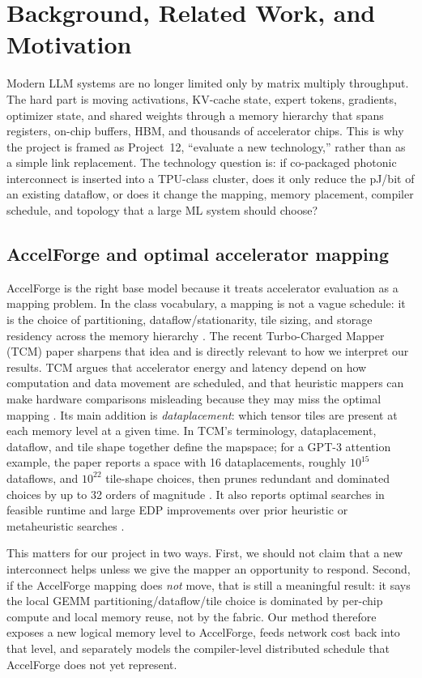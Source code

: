 \documentclass[conference]{IEEEtran}
\begin{document}
\section{Background, Related Work, and Motivation}
\label{sec:related}
Modern LLM systems are no longer limited only by matrix multiply
throughput. The hard part is moving activations, KV-cache state,
expert tokens, gradients, optimizer state, and shared weights through
a memory hierarchy that spans registers, on-chip buffers, HBM, and
thousands of accelerator chips. This is why the project is framed as
Project~12, ``evaluate a new technology,'' rather than as a simple
link replacement. The technology question is: if co-packaged
photonic interconnect is inserted into a TPU-class cluster, does it
only reduce the pJ/bit of an existing dataflow, or does it change the
mapping, memory placement, compiler schedule, and topology that a
large ML system should choose?

\subsection{AccelForge and optimal accelerator mapping}
AccelForge is the right base model because it treats accelerator
evaluation as a mapping problem. In the class vocabulary, a mapping
is not a vague schedule: it is the choice of partitioning,
dataflow/stationarity, tile sizing, and storage residency across the
memory hierarchy \cite{lec05-mapping,lec06-partitioning}. The recent
Turbo-Charged Mapper (TCM) paper sharpens that idea and is directly
relevant to how we interpret our results. TCM argues that accelerator
energy and latency depend on how computation and data movement are
scheduled, and that heuristic mappers can make hardware comparisons
misleading because they may miss the optimal mapping
\cite{tcm}. Its main addition is \emph{dataplacement}: which tensor
tiles are present at each memory level at a given time. In TCM's
terminology, dataplacement, dataflow, and tile shape together define
the mapspace; for a GPT-3 attention example, the paper reports a
space with 16 dataplacements, roughly $10^{15}$ dataflows, and
$10^{22}$ tile-shape choices, then prunes redundant and dominated
choices by up to 32 orders of magnitude \cite{tcm}. It also reports
optimal searches in feasible runtime and large EDP improvements over
prior heuristic or metaheuristic searches \cite{tcm}.

This matters for our project in two ways. First, we should not claim
that a new interconnect helps unless we give the mapper an
opportunity to respond. Second, if the AccelForge mapping does
\emph{not} move, that is still a meaningful result: it says the
local GEMM partitioning/dataflow/tile choice is dominated by
per-chip compute and local memory reuse, not by the fabric. Our
method therefore exposes a new logical memory level to AccelForge,
feeds network cost back into that level, and separately models the
compiler-level distributed schedule that AccelForge does not yet
represent.
\end{document}
